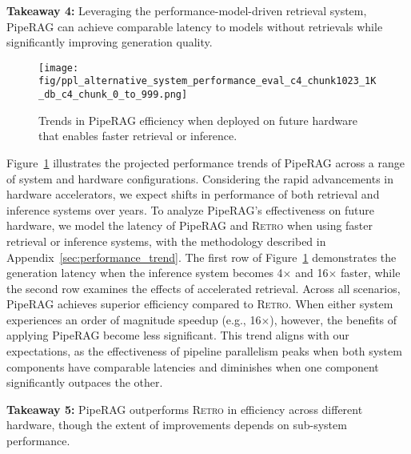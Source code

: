 \begin{tcolorbox}[
    enhanced,
    arc=2mm, %
    outer arc=2mm, %
    boxrule=0.8pt, %
    colframe=black, %
    colback=white, %
    boxsep=0pt, %
    drop shadow southeast, %
]

\textbf{Takeaway 4:} 
Leveraging the performance-model-driven retrieval system, PipeRAG can achieve comparable latency to models without retrievals while significantly improving generation quality. 
\end{tcolorbox}

\begin{figure}%
	\centering
  \texttt{[image: fig/ppl\_alternative\_system\_performance\_eval\_c4\_chunk1023\_1K\_db\_c4\_chunk\_0\_to\_999.png]}
  \vspace{-1.5em}
  \caption{Trends in PipeRAG efficiency when deployed on future hardware that enables faster retrieval or inference.}
  \vspace{-1em}
  \label{fig:different_performance}
\end{figure}

Figure~\ref{fig:different_performance} illustrates the projected performance trends of PipeRAG across a range of system and hardware configurations. Considering the rapid advancements in hardware accelerators, we expect shifts in performance of both retrieval and inference systems over years. To analyze PipeRAG's effectiveness on future hardware, we model the latency of PipeRAG and \textsc{Retro} when using faster retrieval or inference systems, with the methodology described in Appendix~\ref{sec:performance_trend}. 
The first row of Figure~\ref{fig:different_performance} demonstrates the generation latency when the inference system becomes 4$\times$ and 16$\times$ faster, while the second row examines the effects of accelerated retrieval. Across all scenarios, PipeRAG achieves superior efficiency compared to \textsc{Retro}. When either system experiences an order of magnitude speedup (e.g., 16$\times$), however, the benefits of applying PipeRAG become less significant. This trend aligns with our expectations, as the effectiveness of pipeline parallelism peaks when both system components have comparable latencies and diminishes when one component significantly outpaces the other.

\begin{tcolorbox}[
    enhanced,
    arc=2mm, %
    outer arc=2mm, %
    boxrule=0.8pt, %
    colframe=black, %
    colback=white, %
    boxsep=0pt, %
    drop shadow southeast, %
]

\textbf{Takeaway 5:} PipeRAG outperforms \textsc{Retro} in efficiency across different hardware, though the extent of improvements depends on sub-system performance.
\end{tcolorbox}

